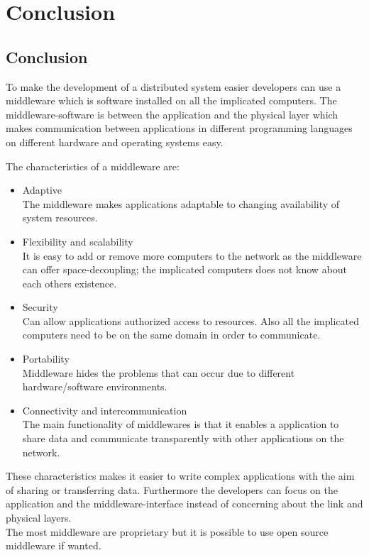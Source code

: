 \documentclass[Main]{subfiles}
\begin{document}
\chapter{Conclusion}

\section{Conclusion}
To make the development of a distributed system easier developers can use a middleware which is  software installed on all the implicated computers. 
The middleware-software is between the application and the physical layer which makes communication between applications in different programming languages on different hardware and operating systems easy.

The characteristics of a middleware are:

\begin{itemize}
\item Adaptive
\\
The middleware makes applications adaptable to changing availability of system resources.

\item Flexibility and scalability
\\
It is easy to add or remove more computers to the network as the middleware can offer space-decoupling; the implicated computers does not know about each others existence.

\item Security
\\
Can allow applications authorized access to resources. Also all the implicated computers need to be on the same domain in order to communicate.

\item Portability
\\
Middleware hides the problems that can occur due to different hardware/software environments.

\item Connectivity and intercommunication
\\
The main functionality of middlewares is that it enables a application to share data and communicate transparently with other applications on the network.

\end{itemize}

These characteristics makes it easier to write complex applications with the aim of sharing or transferring data. 
Furthermore the developers can focus on the application and the middleware-interface instead of concerning about the link and physical layers.
\\
The most middleware are proprietary but it is possible to use open source middleware if wanted.
\end{document}
